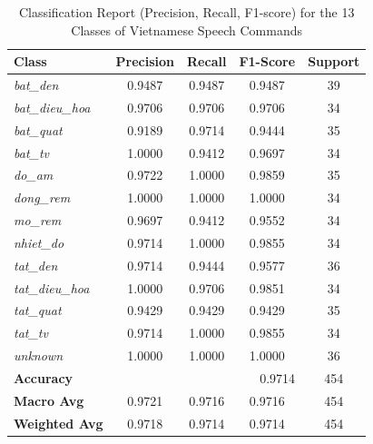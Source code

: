 \begin{table}[htbp]

\centering

\caption{\label{tab:classification_report}Classification Report (Precision, Recall, F1-score) for the 13 Classes of Vietnamese Speech Commands}

\begin{tabular}{|l|c|c|c|c|}

\toprule

\textbf{Class} & \textbf{Precision} & \textbf{Recall} & \textbf{F1-Score} & \textbf{Support} \\

\midrule

\textit{bat\_den} & 0.9487 & 0.9487 & 0.9487 & 39 \\

\textit{bat\_dieu\_hoa} & 0.9706 & 0.9706 & 0.9706 & 34 \\

\textit{bat\_quat} & 0.9189 & 0.9714 & 0.9444 & 35 \\

\textit{bat\_tv} & 1.0000 & 0.9412 & 0.9697 & 34 \\

\textit{do\_am} & 0.9722 & 1.0000 & 0.9859 & 35 \\

\textit{dong\_rem} & 1.0000 & 1.0000 & 1.0000 & 34 \\

\textit{mo\_rem} & 0.9697 & 0.9412 & 0.9552 & 34 \\

\textit{nhiet\_do} & 0.9714 & 1.0000 & 0.9855 & 34 \\

\textit{tat\_den} & 0.9714 & 0.9444 & 0.9577 & 36 \\

\textit{tat\_dieu\_hoa} & 1.0000 & 0.9706 & 0.9851 & 34 \\

\textit{tat\_quat} & 0.9429 & 0.9429 & 0.9429 & 35 \\

\textit{tat\_tv} & 0.9714 & 1.0000 & 0.9855 & 34 \\

\textit{unknown} & 1.0000 & 1.0000 & 1.0000 & 36 \\

\midrule

\textbf{Accuracy} & \multicolumn{3}{r|}{0.9714} & 454 \\

\textbf{Macro Avg} & 0.9721 & 0.9716 & 0.9716 & 454 \\

\textbf{Weighted Avg} & 0.9718 & 0.9714 & 0.9714 & 454 \\

\bottomrule

\end{tabular}

\end{table}



